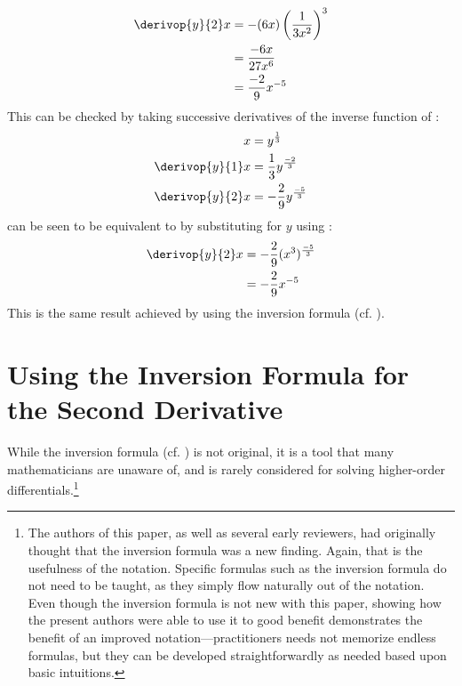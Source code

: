 \begin{align}
\derivop{y}{2}x &= -(6x) \left(\frac{1}{3x^2}\right)^3 \nonumber \\
 &= \frac{-6x}{27x^6} \nonumber \\
 &= \frac{-2}{9}x^{-5} \label{inverseexsecondbyformula}
\end{align}
This can be checked by taking successive derivatives of the inverse function of :
\begin{align}
x &= y^{\frac{1}{3}} \nonumber \\
\derivop{y}{1}x &= \frac{1}{3}y^{\frac{-2}{3}} \nonumber \\
\derivop{y}{2}x &= -\frac{2}{9}y^{\frac{-5}{3}} \label{inverseexsecond}
\end{align}
 can be seen to be equivalent to  by substituting for $y$ using :
\begin{align}
\derivop{y}{2}x &= -\frac{2}{9}(x^3)^{\frac{-5}{3}} \nonumber \\
 &= -\frac{2}{9}x^{-5} 
\end{align}
This is the same result achieved by using the inversion formula (cf. ).

%


\section{Using the Inversion Formula for the Second Derivative}
\label{secinversionapplication}

While the inversion formula (cf. ) is not original, it is a tool that many mathematicians are unaware of, and is rarely considered for solving higher-order differentials.\footnote{The authors of this paper, as well as several early reviewers, had originally thought that the inversion formula was a new finding.
  Again, that is the usefulness of the notation.
  Specific formulas such as the inversion formula do not need to be taught, as they simply flow naturally out of the notation.
  Even though the inversion formula is not new with this paper, showing how the present authors were able to use it to good benefit demonstrates the benefit of an improved notation---practitioners needs not memorize endless formulas, but they can be developed straightforwardly as needed based upon basic intuitions.
}

